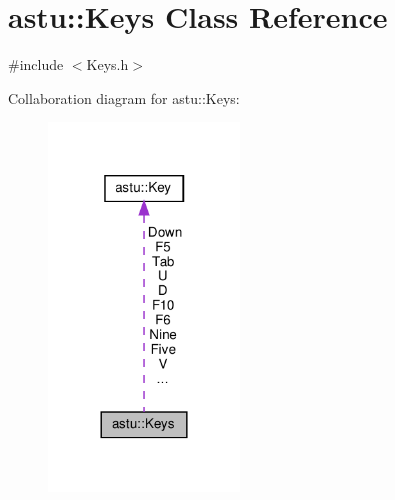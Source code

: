 \hypertarget{classastu_1_1Keys}{}\section{astu\+:\+:Keys Class Reference}
\label{classastu_1_1Keys}


{\ttfamily \#include $<$Keys.\+h$>$}



Collaboration diagram for astu\+:\+:Keys\+:\nopagebreak
\begin{figure}[H]
\begin{center}
\leavevmode
\includegraphics[width=144pt]{classastu_1_1Keys__coll__graph}
\end{center}
\end{figure}
